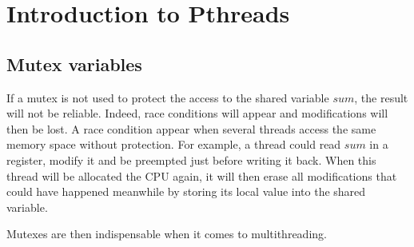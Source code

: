 \chapter{Introduction to Pthreads}

\section{Mutex variables}

If a mutex is not used to protect the access to the shared variable $sum$, the result will not be reliable. Indeed, race conditions will appear and modifications will then be lost. A race condition appear when several threads access the same memory space without protection. For example, a thread could read $sum$ in a register, modify it and be preempted just before writing it back. When this thread will be allocated the CPU again, it will then erase all modifications that could have happened meanwhile by storing its local value into the shared variable.

Mutexes are then indispensable when it comes to multithreading.

